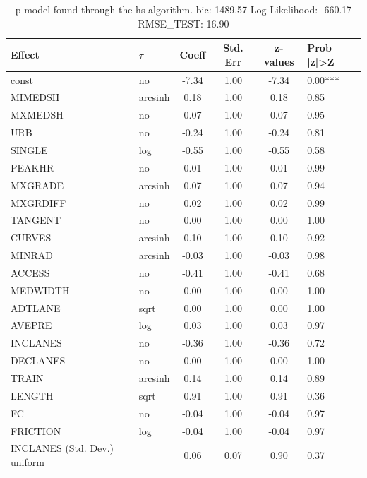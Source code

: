 \begin{table}
	\caption{p model found through the hs algorithm. bic: 1489.57 Log-Likelihood: -660.17 RMSE_TEST: 16.90}
	\begin{center}
		\begin{tabular}{|l|l|c|c|c|l|}
			\hline
			Effect & $\tau$ & Coeff & Std. Err & z-values & Prob |z|>Z \\
			\hline
			const & no & -7.34 & 1.00 & -7.34 & 0.00*** \\
			\hline
			MIMEDSH & arcsinh & 0.18 & 1.00 & 0.18 & 0.85 \\
			\hline
			MXMEDSH & no & 0.07 & 1.00 & 0.07 & 0.95 \\
			\hline
			URB & no & -0.24 & 1.00 & -0.24 & 0.81 \\
			\hline
			SINGLE & log & -0.55 & 1.00 & -0.55 & 0.58 \\
			\hline
			PEAKHR & no & 0.01 & 1.00 & 0.01 & 0.99 \\
			\hline
			MXGRADE & arcsinh & 0.07 & 1.00 & 0.07 & 0.94 \\
			\hline
			MXGRDIFF & no & 0.02 & 1.00 & 0.02 & 0.99 \\
			\hline
			TANGENT & no & 0.00 & 1.00 & 0.00 & 1.00 \\
			\hline
			CURVES & arcsinh & 0.10 & 1.00 & 0.10 & 0.92 \\
			\hline
			MINRAD & arcsinh & -0.03 & 1.00 & -0.03 & 0.98 \\
			\hline
			ACCESS & no & -0.41 & 1.00 & -0.41 & 0.68 \\
			\hline
			MEDWIDTH & no & 0.00 & 1.00 & 0.00 & 1.00 \\
			\hline
			ADTLANE & sqrt & 0.00 & 1.00 & 0.00 & 1.00 \\
			\hline
			AVEPRE & log & 0.03 & 1.00 & 0.03 & 0.97 \\
			\hline
			INCLANES & no & -0.36 & 1.00 & -0.36 & 0.72 \\
			\hline
			DECLANES & no & 0.00 & 1.00 & 0.00 & 1.00 \\
			\hline
			TRAIN & arcsinh & 0.14 & 1.00 & 0.14 & 0.89 \\
			\hline
			LENGTH & sqrt & 0.91 & 1.00 & 0.91 & 0.36 \\
			\hline
			FC & no & -0.04 & 1.00 & -0.04 & 0.97 \\
			\hline
			FRICTION & log & -0.04 & 1.00 & -0.04 & 0.97 \\
			\hline
			INCLANES (Std. Dev.) uniform &  & 0.06 & 0.07 & 0.90 & 0.37 \\
			\hline

\end{tabular}
\end{center}
\end{table}
